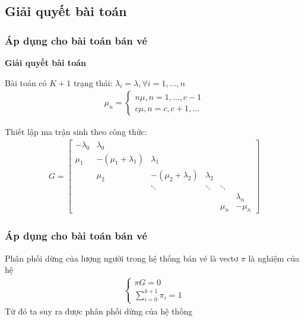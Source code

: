 \documentclass[10pt]{beamer}
\begin{document}
\subsection{Giải quyết bài toán}
\begin{frame}
	\frametitle{Áp dụng cho bài toán bán vé}
	\begin{block}{\textbf{Giải quyết bài toán}}
    \par Bài toán có $K+1$ trạng thái:
    $\lambda_i = \lambda, \forall i = 1,...,n$
    \begin{align*} \mu_n =
        \begin{cases}
        n \mu , n = 1,...,c-1\\
        c \mu , n = c,c+1,...
        \end{cases}
    \end{align*}
 \par Thiết lập ma trận sinh theo công thức:
    \begin{align*} G=
    \begin{bmatrix}
        -\lambda_0 & \lambda_0 \\
        \mu_1 & -(\mu_1 + \lambda_1) & \lambda_1\\
        &\mu_2 & -(\mu_2 + \lambda_2) & \lambda_2\\
        & & {\boldsymbol{\ddots}} & {\boldsymbol{\ddots}} &{\boldsymbol{\ddots}}\\
        & & & & & \lambda_n\\
        & & & &  \mu_n & -\mu_n
    \end{bmatrix}
\end{align*}
\end{block}
\end{frame}
\begin{frame}
	\frametitle{Áp dụng cho bài toán bán vé}
	\begin{block}
\par Phân phối dừng của lượng người trong hệ thống bán vé là vectơ $\pi$ là nghiệm của hệ
\begin{align*}
    \begin{cases}
    \pi G = 0 \\
    \displaystyle\sum_{i=0}^{k+1} \pi_i = 1
    \end{cases}
\end{align*}
Từ đó ta suy ra được phân phối dừng của hệ thống\\
\end{block}
\end{frame}
\end{document}
